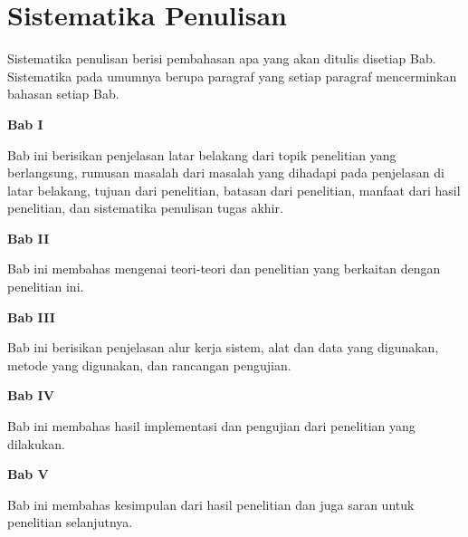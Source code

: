 \section{Sistematika Penulisan} \label{I.Sistematika}
Sistematika penulisan berisi pembahasan apa yang akan ditulis disetiap Bab. Sistematika pada umumnya berupa paragraf yang setiap paragraf mencerminkan bahasan setiap Bab. \par

\noindent\textbf{Bab I}

Bab ini berisikan penjelasan latar belakang dari topik penelitian yang berlangsung, rumusan masalah dari masalah yang dihadapi pada penjelasan di latar belakang, tujuan dari penelitian, batasan dari penelitian, manfaat dari hasil penelitian, dan sistematika penulisan tugas akhir. \par

\noindent\textbf{Bab II}

Bab ini membahas mengenai teori-teori dan penelitian yang berkaitan dengan penelitian ini.

\noindent\textbf{Bab III}

Bab ini berisikan penjelasan alur kerja sistem, alat dan data yang digunakan, metode yang digunakan, dan rancangan pengujian.

\noindent\textbf{Bab IV}

Bab ini membahas hasil implementasi dan pengujian dari penelitian yang dilakukan.

\noindent\textbf{Bab V}

Bab ini membahas kesimpulan dari hasil penelitian dan juga saran untuk penelitian selanjutnya.